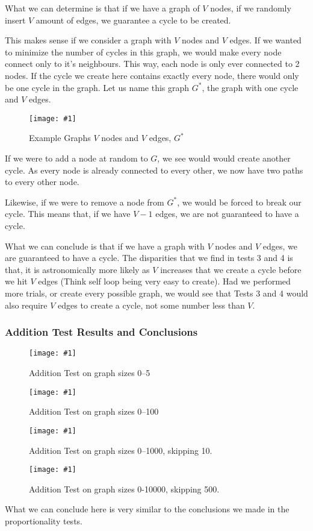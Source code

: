 \documentclass[12pt]{article}
\newcommand{\firgureBuffered}[2]
{
    \begin{figure}[ht!]
        \centering
        \texttt{[image: \#1]}
        \caption{#2}
    \end{figure}
}
\begin{document}
What we can determine is that if we have a graph of $V$ nodes, if we randomly insert $V$ amount of edges, we guarantee a cycle to be created.

This makes sense if we consider a graph with $V$ nodes and $V$ edges. If we wanted to minimize the number of cycles in this graph, we would make every node connect only to it's neighbours. This way, each node is only ever connected to 2 nodes. If the cycle we create here contains exactly every node, there would only be one cycle in the graph.
Let us name this graph $G^{*}$, the graph with one cycle and $V$ edges.

\FloatBarrier{}
\firgureBuffered{images/experiment1/exp1_exp1.png}{Example Graphs $V$ nodes and $V$ edges, $G^{*}$}
\FloatBarrier{}

If we were to add a node at random to $G$, we see would would create another cycle. As every node is already connected to every other, we now have two paths to every other node.

Likewise, if we were to remove a node from $G^{*}$, we would be forced to break our cycle. This means that, if we have $V-1$ edges, we are not guaranteed to have a cycle.

What we can conclude is that if we have a graph with $V$ nodes and $V$ edges, we are guaranteed to have a cycle. The disparities that we find in tests 3 and 4 is that, it is astronomically more likely as $V$ increases that we create a cycle before we hit $V$ edges (Think self loop being very easy to create). Had we performed more trials, or create every possible graph, we would see that Tests 3 and 4 would also require $V$ edges to create a cycle, not some number less than $V$.

\subsubsection{Addition Test Results and Conclusions}

\FloatBarrier{}
\firgureBuffered{images/experiment1/exp1_e.png}{Addition Test on graph sizes 0--5}
\firgureBuffered{images/experiment1/exp1_f.png}{Addition Test on graph sizes 0--100}
\firgureBuffered{images/experiment1/exp1_g.png}{Addition Test on graph sizes 0--1000, skipping 10.}
\firgureBuffered{images/experiment1/exp1_h.png}{Addition Test on graph sizes 0-10000, skipping 500.}
\FloatBarrier{}

What we can conclude here is very similar to the conclusions we made in the proportionality tests.
\end{document}
